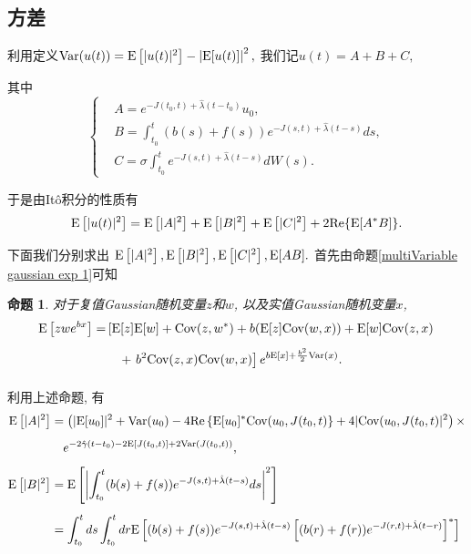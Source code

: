 \documentclass[notitlepage,cs4size,punct,oneside]{ctexrep}
\numberwithin{equation}{section}
\theoremstyle{mystyle}
\newtheorem{proposition}[definition]{\hspace{2em}命题}
\newcommand{\nq}{\\[5pt]}
\begin{document}
\subsection{方差}
利用定义$\text{Var}(u(t)) = \text{E}\left[|u(t)|^2\right] - \left|\text{E}[u(t)]\right|^2,$
我们记$u(t) = A + B + C,$

其中
\[\left\{
\begin{split}
&A = e^{-J(t_0, t)+\hat{\lambda}(t-t_0)}u_0, \nq
&B = \int_{t_0}^t (b(s)+f(s))e^{-J(s, t)+\hat{\lambda}(t-s)}ds, \nq
&C = \sigma\int_{t_0}^t e^{-J(s, t)+\hat{\lambda}(t-s)}dW(s).
\end{split}
\right.
\]

于是由It\^{o}积分的性质有
\begin{equation} \label{E u(t)^2}
\text{E}\left[|u(t)|^2\right] = \text{E}\left[|A|^2\right]+ \text{E}\left[|B|^2\right] + \text{E}\left[|C|^2\right] + 2\text{Re}\{\text{E}[A^*B]\}.
\end{equation}

下面我们分别求出
$
\text{E}\left[|A|^2\right], \text{E}\left[|B|^2\right], \text{E}\left[|C|^2\right], \text{E}[AB].
$
首先由命题\ref{multiVariable gaussian exp 1}可知
\begin{proposition}  \label{multiVariable gaussian exp 3} 对于复值Gaussian随机变量$z$和$w$, 以及实值Gaussian随机变量$x$,
\[
\begin{split}
\E\left[zwe^{bx}\right] =& \left[\E[z]\E[w]+\Cov(z, w^*)+b(\E[z]\Cov(w, x))+\E[w]\Cov(z, x) \right. \nq
&\quad +\left.b^2\Cov(z, x)\Cov(w, x)\right]e^{b\E[x]+\frac{b^2}{2}\Var(x)}. \nq
\end{split}
\]
\end{proposition}

利用上述命题, 有
\[
\begin{split}
\E\left[|A|^2\right] &= \left(|\E[u_0]|^2 +\Var(u_0) - 4\text{Re}\left\{\E[u_0]^*\Cov(u_0, J(t_0, t)\right\} +4|\Cov(u_0, J(t_0, t)|^2\right) \times \nq
& \quad e^{-2\hat{\gamma}(t-t_0)-2\E[J(t_0, t)]+2\Var(J(t_0, t))}, \nq
\E\left[|B|^2\right] &= \E\left[\left|\int_{t_0}^t (b(s)+f(s))e^{-J(s, t)+\hat{\lambda}(t-s)}ds\right|^2\right] \nq
&= \int_{t_0}^t ds\int_{t_0}^t dr \E\left[(b(s)+f(s))e^{-J(s, t)+\hat{\lambda}(t-s)}\left[(b(r)+f(r))e^{-J(r, t)+\hat{\lambda}(t-r)}\right]^*\right]
\end{split}
\]
\end{document}
